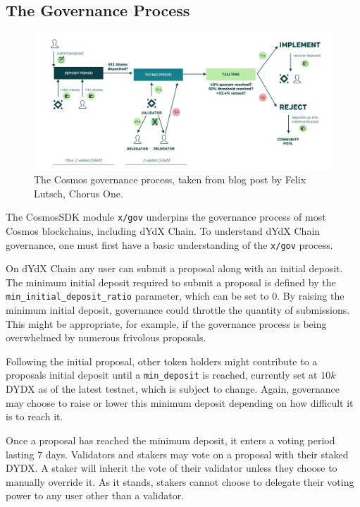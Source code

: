     \subsection{The Governance Process}

        \begin{figure}[htp]
            \centering
            \includegraphics[width=\linewidth]{figs/cosmos_gov.png}
            \caption{The Cosmos governance process, taken from  blog post by Felix Lutsch, Chorus One.}
            \label{fig:cosmos_gov}
        \end{figure}

        The CosmosSDK module \texttt{x/gov} underpins the governance process of most Cosmos blockchains, including dYdX Chain. To understand dYdX Chain governance, one must first have a basic understanding of the \texttt{x/gov} process.

        On dYdX Chain any user can submit a proposal along with an initial deposit. The minimum initial deposit required to submit a proposal is defined by the \texttt{min\_initial\_deposit\_ratio} parameter, which can be set to $0$. By raising the minimum initial deposit, governance could throttle the quantity of submissions. This might be appropriate, for example, if the governance process is being overwhelmed by numerous frivolous proposals.

        Following the initial proposal, other token holders might contribute to a proposals initial deposit until a \texttt{min\_deposit} is reached, currently set at $10k$ DYDX as of the latest testnet, which is subject to change. Again, governance may choose to raise or lower this minimum deposit depending on how difficult it is to reach it.

        Once a proposal has reached the minimum deposit, it enters a voting period lasting 7 days. Validators and stakers may vote on a proposal with their staked DYDX. A staker will inherit the vote of their validator unless they choose to manually override it. As it stands, stakers cannot choose to delegate their voting power to any user other than a validator.

